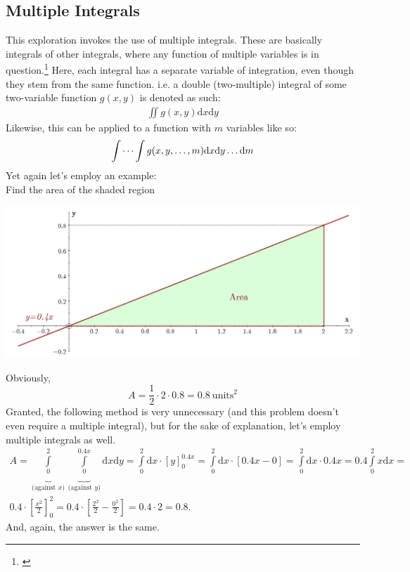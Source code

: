 \subsection{Multiple Integrals} \label{multiint}
This exploration invokes the use of multiple integrals. These are basically integrals of other integrals, where any function of multiple variables is in question.\footnote{\cite{stewart_2008_int}} Here, each integral has a separate variable of integration, even though they stem from the same function. i.e. a double (two-multiple) integral of some two-variable function $g(x,y)$ is denoted as such:
\begin{gather*}
\iint g(x,y) \mathrm{d}x\mathrm{d}y
\end{gather*}
Likewise, this can be applied to a function with $m$ variables like so:
\begin{gather*}
\idotsint g(x,y,\dots,m) \mathrm{d}x\mathrm{d}y \dots \mathrm{d}m
\end{gather*}
Yet again let's employ an example: \\
Find the area of the shaded region\\
\begin{center}
\includegraphics[scale=0.3]{updated/int}
\end{center}
Obviously, $$A=\frac{1}{2}\cdot 2 \cdot 0.8 = 0.8 \ \text{units}^{2}$$ Granted, the following method is very unnecessary (and this problem doesn't even require a multiple integral), but for the sake of explanation, let's employ multiple integrals as well.
\begin{gather*}
A = \underbrace{\int\limits_{0}^{2}}_{\text{(against } x\text{)}} \underbrace{\int\limits_{0}^{0.4x}}_{\text{(against } y\text{)}} \mathrm{d}x \mathrm{d}y =  \int\limits_{0}^{2} \mathrm{d}x \cdot \left[ y \right]_{0}^{0.4x} =  \int\limits_{0}^{2} \mathrm{d}x \cdot  \left[ 0.4x - 0 \right] = \int\limits_{0}^{2} \mathrm{d}x \cdot 0.4x = 0.4 \int\limits_{0}^{2} x\mathrm{d}x = \\
0.4 \cdot \left[ \frac{x^{2}}{2} \right]_{0}^{2} = 0.4 \cdot \left[ \frac{2^{2}}{2} - \frac{0^{2}}{2} \right] = 0.4 \cdot 2 = 0.8.
\end{gather*}
And, again, the answer is the same.
